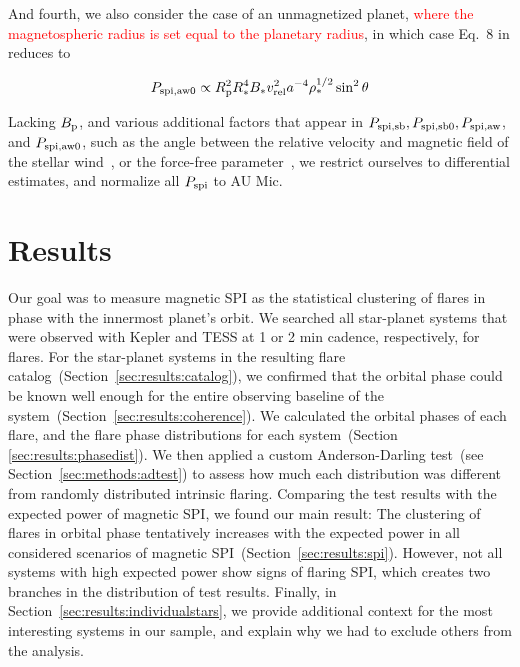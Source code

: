 \documentclass[twocolumn]{aastex631}
\begin{document}
And fourth, we also consider the case of an unmagnetized planet, \textcolor{red}{ where the magnetospheric radius is set equal to the planetary radius}, in which case Eq.~8 in \cite{kavanagh2022radio} reduces to

\begin{equation}
    P_{\rm spi,aw0} \propto R_{\rm p}^2 R_*^4 B_*  v_{\rm rel}^2 a^{-4} \rho_*^{1/2} \sin^2 \theta
\end{equation}

Lacking $B_{\rm p}$, and various additional factors that appear in $P_{\rm spi,sb},P_{\rm spi,sb0},P_{\rm spi,aw}$, and  $P_{\rm spi,aw0}$, such as the angle between the relative velocity and magnetic field of the stellar wind~\citep{kavanagh2022radio}, or the force-free parameter~\citep{lanza2012starplanet}, we restrict ourselves to differential estimates, and normalize all $P_{\rm spi}$ to AU Mic.

\section{Results}
\label{sec:results}

Our goal was to measure magnetic SPI as the statistical clustering of flares in phase with the innermost planet's orbit. We searched all star-planet systems that were observed with Kepler and TESS at 1 or 2 min cadence, respectively, for flares. For the star-planet systems in the resulting flare catalog~(Section~\ref{sec:results:catalog}), we confirmed that the orbital phase could be known well enough for the entire observing baseline of the system~(Section~\ref{sec:results:coherence}). We calculated the orbital phases of each flare, and the flare phase distributions for each system~(Section \ref{sec:results:phasedist}). We then applied a custom Anderson-Darling test~(see Section~\ref{sec:methods:adtest}) to assess how much each distribution was different from randomly distributed intrinsic flaring. Comparing the test results with the expected power of magnetic SPI, we found our main result: The clustering of flares in orbital phase tentatively increases with the expected power in all considered scenarios of magnetic SPI~(Section~\ref{sec:results:spi}). However, not all systems with high expected power show signs of flaring SPI, which creates two branches in the distribution of test results. Finally, in Section~\ref{sec:results:individualstars}, we provide additional context for the most interesting systems in our sample, and explain why we had to exclude others from the analysis.
\end{document}
